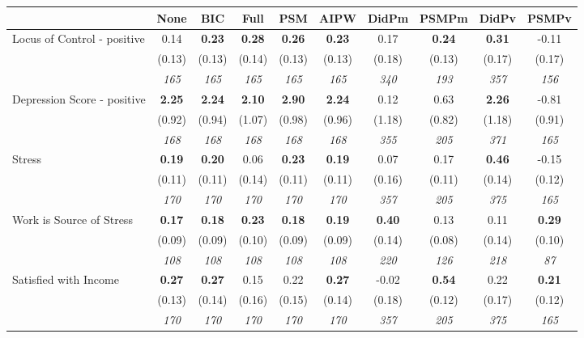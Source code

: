 \begin{tabular}{l c c c c c c c c c}
\toprule
 & None & BIC & Full & PSM & AIPW & DidPm & PSMPm & DidPv & PSMPv \\
\midrule
Locus of Control - positive & 0.14 & \textbf{ 0.23 } & \textbf{ 0.28 } & \textbf{0.26} & \textbf{0.23} & 0.17 & \textbf{0.24} & \textbf{ 0.31 } & -0.11 \\
& (0.13) & (0.13) & (0.14) & (0.13) & (0.13) & (0.18) & (0.13) & (0.17) & (0.17) \\
& \textit{ 165 } & \textit{ 165 } & \textit{ 165 } & \textit{ 165 } & \textit{ 165 } & \textit{ 340 } & \textit{ 193 } & \textit{ 357 } & \textit{ 156 } \\
Depression Score - positive & \textbf{ 2.25 } & \textbf{ 2.24 } & \textbf{ 2.10 } & \textbf{2.90} & \textbf{2.24} & 0.12 & 0.63 & \textbf{ 2.26 } & -0.81 \\
& (0.92) & (0.94) & (1.07) & (0.98) & (0.96) & (1.18) & (0.82) & (1.18) & (0.91) \\
& \textit{ 168 } & \textit{ 168 } & \textit{ 168 } & \textit{ 168 } & \textit{ 168 } & \textit{ 355 } & \textit{ 205 } & \textit{ 371 } & \textit{ 165 } \\
Stress & \textbf{ 0.19 } & \textbf{ 0.20 } & 0.06 & \textbf{0.23} & \textbf{0.19} & 0.07 & 0.17 & \textbf{ 0.46 } & -0.15 \\
& (0.11) & (0.11) & (0.14) & (0.11) & (0.11) & (0.16) & (0.11) & (0.14) & (0.12) \\
& \textit{ 170 } & \textit{ 170 } & \textit{ 170 } & \textit{ 170 } & \textit{ 170 } & \textit{ 357 } & \textit{ 205 } & \textit{ 375 } & \textit{ 165 } \\
Work is Source of Stress & \textbf{ 0.17 } & \textbf{ 0.18 } & \textbf{ 0.23 } & \textbf{0.18} & \textbf{0.19} & \textbf{ 0.40 } & 0.13 & 0.11 & \textbf{0.29} \\
& (0.09) & (0.09) & (0.10) & (0.09) & (0.09) & (0.14) & (0.08) & (0.14) & (0.10) \\
& \textit{ 108 } & \textit{ 108 } & \textit{ 108 } & \textit{ 108 } & \textit{ 108 } & \textit{ 220 } & \textit{ 126 } & \textit{ 218 } & \textit{ 87 } \\
Satisfied with Income & \textbf{ 0.27 } & \textbf{ 0.27 } & 0.15 & 0.22 & \textbf{0.27} & -0.02 & \textbf{0.54} & 0.22 & \textbf{0.21} \\
& (0.13) & (0.14) & (0.16) & (0.15) & (0.14) & (0.18) & (0.12) & (0.17) & (0.12) \\
& \textit{ 170 } & \textit{ 170 } & \textit{ 170 } & \textit{ 170 } & \textit{ 170 } & \textit{ 357 } & \textit{ 205 } & \textit{ 375 } & \textit{ 165 } \\

\end{tabular}
